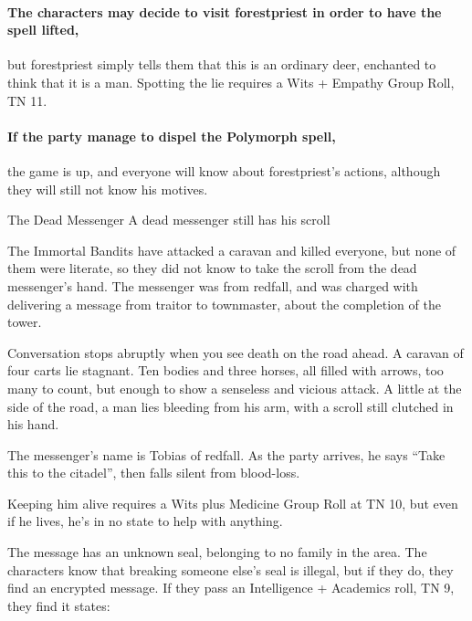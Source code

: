 \begin{multicols}{2}
\paragraph{The characters may decide to visit \gls{forestpriest} in order to have the spell lifted,}
but \gls{forestpriest} simply tells them that this is an ordinary deer, enchanted to think that it is a man.
Spotting the lie requires a Wits + Empathy Group Roll, TN 11.

\paragraph{If the party manage to dispel the Polymorph spell,}
the game is up, and everyone will know about \gls{forestpriest}'s actions, although they will still not know his motives.

{The Dead Messenger}%
{A dead messenger still has his scroll}%

The Immortal Bandits have attacked a caravan and killed everyone, but none of them were literate, so they did not know to take the scroll from the dead messenger's hand.
The messenger was from \gls{redfall}, and was charged with delivering a message from \gls{traitor} to \gls{townmaster}, about the completion of the tower.

\begin{boxtext}

	Conversation stops abruptly when you see death on the road ahead.
	A caravan of four carts lie stagnant.
	Ten bodies and three horses, all filled with arrows, too many to count, but enough to show a senseless and vicious attack.
	A little at the side of the road, a man lies bleeding from his arm, with a scroll still clutched in his hand.

\end{boxtext}

The messenger's name is Tobias of \gls{redfall}.
As the party arrives, he says ``Take this to the citadel'', then falls silent from blood-loss.

Keeping him alive requires a Wits plus Medicine Group Roll at TN 10, but even if he lives, he's in no state to help with anything.

The message has an unknown seal, belonging to no family in the area.
The characters know that breaking someone else's seal is illegal, but if they do, they find an encrypted message.
If they pass an Intelligence + Academics roll, TN 9, they find it states:

\begin{speechtext}


\end{speechtext}
\end{multicols}
